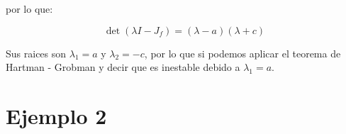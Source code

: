             por lo que:

            \begin{equation*}
                \det{(\lambda I - J_f)} = \left( \lambda - a \right) \left( \lambda + c \right)
            \end{equation*}

            Sus raices son $\lambda_1 = a$ y $\lambda_2 = -c$, por lo que si podemos aplicar el teorema de Hartman - Grobman y decir que es inestable debido a $\lambda_1 = a$.

    \section{Ejemplo 2}


